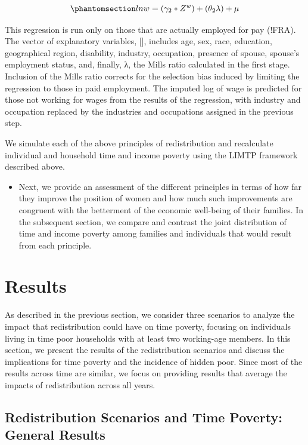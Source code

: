 \documentclass[
  11pt,
]{article}
\providecommand{\tightlist}{%
  \setlength{\itemsep}{0pt}\setlength{\parskip}{0pt}}\usepackage{longtable,booktabs,array}
\begin{document}
\begin{equation}\phantomsection\label{eq-OLS}{lnw= (\gamma_2*Z^w) + (\theta_2 \lambda) + \mu
}\end{equation}

This regression is run only on those that are actually employed for pay
(!FRA). The vector of explanatory variables, {[}{]}, includes age, sex,
race, education, geographical region, disability, industry, occupation,
presence of spouse, spouse's employment status, and, finally, λ, the
Mills ratio calculated in the first stage. Inclusion of the Mills ratio
corrects for the selection bias induced by limiting the regression to
those in paid employment. The imputed log of wage is predicted for those
not working for wages from the results of the regression, with industry
and occupation replaced by the industries and occupations assigned in
the previous step.

We simulate each of the above principles of redistribution and
recalculate individual and household time and income poverty using the
LIMTP framework described above.

\begin{itemize}
\tightlist
\item
  Next, we provide an assessment of the different principles in terms of
  how far they improve the position of women and how much such
  improvements are congruent with the betterment of the economic
  well-being of their families. In the subsequent section, we compare
  and contrast the joint distribution of time and income poverty among
  families and individuals that would result from each principle.
\end{itemize}

\section{Results}\label{results}

As described in the previous section, we consider three scenarios to
analyze the impact that redistribution could have on time poverty,
focusing on individuals living in time poor households with at least two
working-age members. In this section, we present the results of the
redistribution scenarios and discuss the implications for time poverty
and the incidence of hidden poor. Since most of the results across time
are similar, we focus on providing results that average the impacts of
redistribution across all years.

\subsection{Redistribution Scenarios and Time Poverty: General
Results}\label{redistribution-scenarios-and-time-poverty-general-results}
\end{document}
